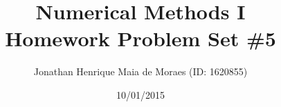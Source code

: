 \title{Numerical Methods I \\ Homework Problem Set \#5}
\author{Jonathan Henrique Maia de Moraes (ID: 1620855)}
\date{10/01/2015}
\maketitle